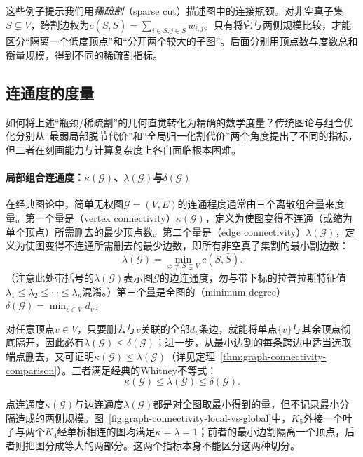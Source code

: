 这些例子提示我们用\emph{稀疏割}（sparse cut）描述图中的连接瓶颈。对非空真子集$S\subsetneq V$，跨割边权为$c(S,\bar S)=\sum_{i\in S,j\in\bar S}w_{i,j}$。只有将它与两侧规模比较，才能区分“隔离一个低度顶点”和“分开两个较大的子图”。后面分别用顶点数与度数总和衡量规模，得到不同的稀疏割指标。

\subsection{连通度的度量}
\label{sec:graph-connectivity-measures}

如何将上述“瓶颈/稀疏割”的几何直觉转化为精确的数学度量？传统图论与组合优化分别从“最弱局部脱节代价”和“全局归一化割代价”两个角度提出了不同的指标，但二者在刻画能力与计算复杂度上各自面临根本困难。

\paragraph{局部组合连通度：$\kappa(\mathcal G)$、$\lambda(\mathcal G)$与$\delta(\mathcal G)$}

在经典图论中，简单无权图$\mathcal G=(V,E)$的连通程度通常由三个离散组合量来度量。第一个量是（vertex connectivity）$\kappa(\mathcal G)$，定义为使图变得不连通（或缩为单个顶点）所需删去的最少顶点数。第二个量是（edge connectivity）$\lambda(\mathcal G)$，定义为使图变得不连通所需删去的最少边数，即所有非空真子集割的最小割边数：
\begin{equation}
\label{eq:graph-edge-connectivity-def}
  \lambda(\mathcal G) = \min_{\varnothing\neq S\subsetneq V} c(S,\bar S).
\end{equation}
（注意此处带括号的$\lambda(\mathcal G)$表示图$\mathcal G$的边连通度，勿与带下标的拉普拉斯特征值$\lambda_1\leq\lambda_2\leq\cdots\leq\lambda_n$混淆。）第三个量是全图的（minimum degree）$\delta(\mathcal G)=\min_{v\in V}d_v$。

对任意顶点$v\in V$，只要删去与$v$关联的全部$d_v$条边，就能将单点$\{v\}$与其余顶点彻底隔开，因此必有$\lambda(\mathcal G)\leq\delta(\mathcal G)$；进一步，从最小边割的每条跨边中适当选取端点删去，又可证明$\kappa(\mathcal G)\leq\lambda(\mathcal G)$（详见定理~\ref{thm:graph-connectivity-comparison}）。三者满足经典的Whitney不等式：
\begin{equation}
\label{eq:graph-whitney-inequality}
  \kappa(\mathcal G) \leq \lambda(\mathcal G) \leq \delta(\mathcal G).
\end{equation}

点连通度$\kappa(\mathcal G)$与边连通度$\lambda(\mathcal G)$都是对全图取最小得到的量，但不记录最小分隔造成的两侧规模。图~\ref{fig:graph-connectivity-local-vs-global}中，$K_5$外接一个叶子与两个$K_4$经单桥相连的图均满足$\kappa=\lambda=1$；前者的最小边割隔离一个顶点，后者则把图分成等大的两部分。这两个指标本身不能区分这两种切分。

